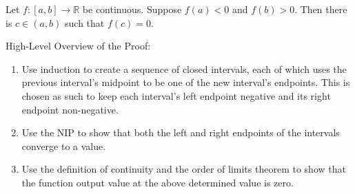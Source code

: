 \documentclass[12pt]{article}
\newcommand{\RR}{\mathbb{R}} %
\begin{document}
Let $f: [a, b] \rightarrow \RR$ be continuous. Suppose $f(a) < 0$ and $f(b) > 0$. Then there is $c \in (a, b)$ such that $f(c) = 0$.

\dotfill

High-Level Overview of the Proof:

\begin{enumerate}
\item Use induction to create a sequence of closed intervals, each of which uses the previous interval's midpoint to be one of the new interval's endpoints. This is chosen as such to keep each interval's left endpoint negative and its right endpoint non-negative.

\item Use the NIP to show that both the left and right endpoints of the intervals converge to a value.

\item Use the definition of continuity and the order of limits theorem to show that the function output value at the above determined value is zero.
\end{enumerate}

\dotfill
\end{document}
